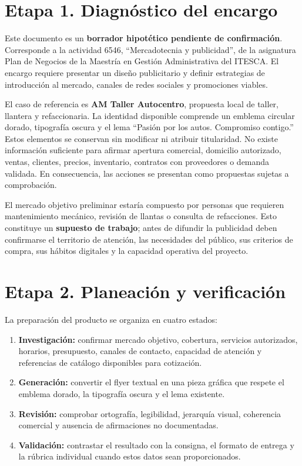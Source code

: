 \documentclass[12pt,letterpaper,oneside]{article}
\begin{document}
\section{Etapa 1. Diagnóstico del encargo}

Este documento es un \textbf{borrador hipotético pendiente de confirmación}. Corresponde a la actividad 6546, ``Mercadotecnia y publicidad'', de la asignatura Plan de Negocios de la Maestría en Gestión Administrativa del ITESCA. El encargo requiere presentar un diseño publicitario y definir estrategias de introducción al mercado, canales de redes sociales y promociones viables.

El caso de referencia es \textbf{AM Taller Autocentro}, propuesta local de taller, llantera y refaccionaria. La identidad disponible comprende un emblema circular dorado, tipografía oscura y el lema ``Pasión por los autos. Compromiso contigo.'' Estos elementos se conservan sin modificar ni atribuir titularidad. No existe información suficiente para afirmar apertura comercial, domicilio autorizado, ventas, clientes, precios, inventario, contratos con proveedores o demanda validada. En consecuencia, las acciones se presentan como propuestas sujetas a comprobación.

El mercado objetivo preliminar estaría compuesto por personas que requieren mantenimiento mecánico, revisión de llantas o consulta de refacciones. Esto constituye un \textbf{supuesto de trabajo}; antes de difundir la publicidad deben confirmarse el territorio de atención, las necesidades del público, sus criterios de compra, sus hábitos digitales y la capacidad operativa del proyecto.

\section{Etapa 2. Planeación y verificación}

La preparación del producto se organiza en cuatro estados:

\begin{enumerate}
    \item \textbf{Investigación:} confirmar mercado objetivo, cobertura, servicios autorizados, horarios, presupuesto, canales de contacto, capacidad de atención y referencias de catálogo disponibles para cotización.
    \item \textbf{Generación:} convertir el flyer textual en una pieza gráfica que respete el emblema dorado, la tipografía oscura y el lema existente.
    \item \textbf{Revisión:} comprobar ortografía, legibilidad, jerarquía visual, coherencia comercial y ausencia de afirmaciones no documentadas.
    \item \textbf{Validación:} contrastar el resultado con la consigna, el formato de entrega y la rúbrica individual cuando estos datos sean proporcionados.
\end{enumerate}
\end{document}
